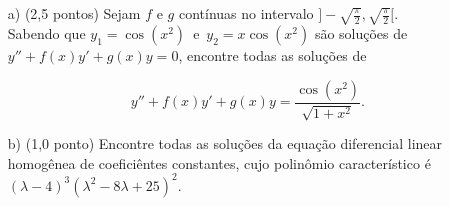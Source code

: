 \documentclass[12pt,a4paper]{article}
\begin{document}

\newpage
{}
\begin{itemize}
\item[a)] (2,5 pontos) Sejam $f$ e $g$ contínuas no intervalo $\Big] - \displaystyle\sqrt{\frac{\pi}{2}} , \displaystyle\sqrt{\frac{\pi}{2}} \Big[$. \\

Sabendo que $y_1 = \cos(x^2) \,$ e $\, y_2 = x \cos(x^2)$ são soluções de $y'' + f(x)y' + g(x)y = 0$, encontre todas as soluções de

$$y'' + f(x)y' + g(x)y = \frac{\cos(x^2)}{\sqrt{1+x^2}}.$$

\item[b)] (1,0 ponto) Encontre todas as soluções da equação diferencial linear homogênea de coeficiêntes constantes, cujo polinômio característico é $(\lambda - 4)^3 (\lambda^2 - 8\lambda + 25)^2$.

\end{itemize}


\\
\end{document}
